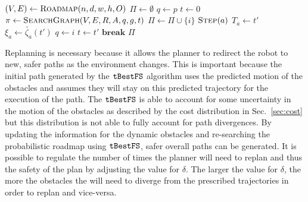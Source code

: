 \begin{algorithm}[ht]
    \caption{$\Function{GetPath}(n, d, w, h, \delta, p, g, O, A, R)$}
    \\\algorithmicensure{}
    \label{algo:path}
    \begin{algorithmic}[1]
        \setcounter{ALC@line}{0}
        \STATE $(V, E) \leftarrow \Function{Roadmap}(n, d, w, h, O)$
        \STATE $\Pi \leftarrow \emptyset$
        \STATE $q \leftarrow p$
        \STATE $t \leftarrow 0$
            \STATE $\pi \leftarrow \Function{SearchGraph}(V, E, R, A, q, g, t)$
                \STATE $\Pi \leftarrow \Pi \cup \{i\}$
                    \STATE $\Function{Step}(a)$
                \ENDFOR
                        \STATE $T_a \leftarrow t'$
                        \STATE $\xi_a \leftarrow \tilde{\zeta_a}(t')$
                    \ENDFOR
                    \STATE $q \leftarrow i$
                    \STATE $t \leftarrow t'$
                    \STATE $\textbf{break}$
                \ENDIF
            \ENDFOR
        \ENDWHILE
        \RETURN $\Pi$
    \end{algorithmic}
\end{algorithm}

Replanning is necessary because it allows the planner to redirect the robot to
new, safer paths as the environment changes. This is important because the
initial path generated by the $\Acronym{tBestFS}$ algorithm uses the predicted
motion of the obstacles and assumes they will stay on this predicted trajectory
for the execution of the path. The $\Acronym{tBestFS}$ is able to account for
some uncertainty in the motion of the obstacles as described by the cost
distribution in Sec.~\ref{sec:cost} but this distribution is not able to fully
account for path divergences. By updating the information for the dynamic
obstacles and re-searching the probabilistic roadmap using $\Acronym{tBestFS}$,
safer overall paths can be generated. It is possible to regulate the number of
times the planner will need to replan and thus the safety of the plan by
adjusting the value for $\delta$. The larger the value for $\delta$, the more
the obstacles the will need to diverge from the prescribed trajectories in
order to replan and vice-versa.


